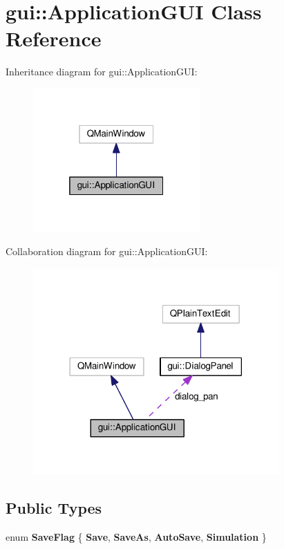 \hypertarget{classgui_1_1ApplicationGUI}{}\section{gui\+:\+:Application\+G\+UI Class Reference}
\label{classgui_1_1ApplicationGUI}


Inheritance diagram for gui\+:\+:Application\+G\+UI\+:\nopagebreak
\begin{figure}[H]
\begin{center}
\leavevmode
\includegraphics[width=181pt]{classgui_1_1ApplicationGUI__inherit__graph}
\end{center}
\end{figure}


Collaboration diagram for gui\+:\+:Application\+G\+UI\+:\nopagebreak
\begin{figure}[H]
\begin{center}
\leavevmode
\includegraphics[width=266pt]{classgui_1_1ApplicationGUI__coll__graph}
\end{center}
\end{figure}
\subsection*{Public Types}
\begin{DoxyCompactItemize}
\item 
enum {\bfseries Save\+Flag} \{ {\bfseries Save}, 
{\bfseries Save\+As}, 
{\bfseries Auto\+Save}, 
{\bfseries Simulation}
 \}\hypertarget{classgui_1_1ApplicationGUI_a5fcaff4e236a007b986201375173c1dc}{}\label{classgui_1_1ApplicationGUI_a5fcaff4e236a007b986201375173c1dc}

\end{DoxyCompactItemize}
